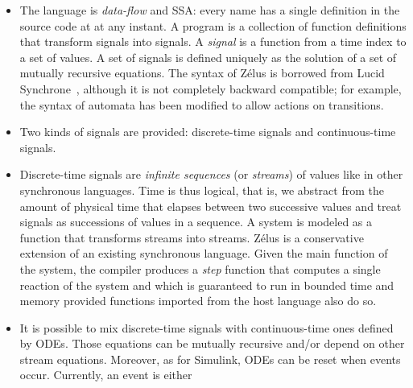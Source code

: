\documentclass[11pt,titlepage,twoside]{report}
\newenvironment{flatitemize}
  {\begin{itemize}[leftmargin=*]}
  {\end{itemize}}
\newcommand{\zelus}{{\sf Z\'elus}}
\newcommand{\lucy}{{\sf Lucid Synchrone}}
\newcommand{\simulink}{{\sf Simulink}}
\begin{document}
\begin{flatitemize}
\item
The language is \emph{data-flow} and \ac{SSA}: every name has a single 
definition in the source code at at any instant. A program is a collection 
of function definitions that
transform signals into signals. A \emph{signal} is a function from a
time index to a set of values. A set of signals is defined uniquely as
the solution of a set of mutually recursive equations. The syntax of
\zelus{} is borrowed from \lucy~\cite{lucy:manual06}, although it is not 
completely backward compatible; for example, the syntax of automata has been 
modified to allow actions on transitions.
\item
Two kinds of signals are provided: discrete-time signals and
continuous-time signals.
\item
Discrete-time signals are \emph{infinite sequences} (or
\emph{streams}) of values like in other synchronous languages. Time
is thus logical, that is, we abstract from the amount of physical time that 
elapses between two successive values and treat signals as successions of 
values in a sequence.
A system is modeled
as a function that transforms streams into streams. \zelus{} is a
conservative extension of an existing synchronous language. Given the
main function of the system, the compiler produces a \emph{step}
function that computes a single reaction of the system and which is 
guaranteed
to run in bounded time and memory provided functions imported from the host 
language also do so.
\item
It is possible to mix discrete-time signals with continuous-time
ones defined by \acp{ODE}. Those
equations can be mutually recursive and/or depend on other stream
equations. Moreover, as for \simulink, \acp{ODE} can be reset when events 
occur. Currently, an event is either


\end{flatitemize}
\end{document}
